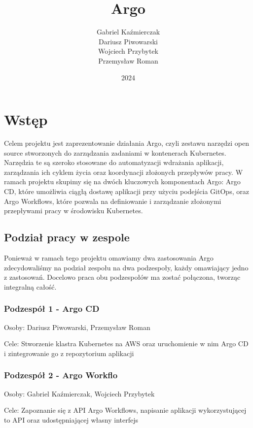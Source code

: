 \documentclass{article}
\title{\textbf{Argo}}
\author{Gabriel Kaźmierczak\\ Dariusz Piwowarski\\ Wojciech Przybytek\\ Przemysław Roman}
\date{2024}
\begin{document}
\begin{titlingpage}
\maketitle
\end{titlingpage}


\newpage
\tableofcontents


\newpage
\section{Wstęp}
Celem projektu jest zaprezentowanie działania Argo, czyli zestawu narzędzi open source stworzonych do zarządzania zadaniami w kontenerach Kubernetes. Narzędzia te są szeroko stosowane do automatyzacji wdrażania aplikacji, zarządzania ich cyklem życia oraz koordynacji złożonych przepływów pracy. W ramach projektu skupimy się na dwóch kluczowych komponentach Argo: Argo CD, które umożliwia ciągłą dostawę aplikacji przy użyciu podejścia GitOps, oraz Argo Workflows, które pozwala na definiowanie i zarządzanie złożonymi przepływami pracy w środowisku Kubernetes.

\subsection*{Podział pracy w zespole}
Ponieważ w ramach tego projektu omawiamy dwa zastosowania Argo zdecydowaliśmy na podział zespołu na dwa podzespoły, każdy omawiający jedno z zastosowań.
Docelowo praca obu podzespołów ma zostać połączona, tworząc integralną całość.

\subsubsection*{Podzespół 1 - Argo CD}
Osoby: Dariusz Piwowarski, Przemysław Roman

Cele: Stworzenie klastra Kubernetes na AWS oraz uruchomienie w nim Argo CD i zintegrowanie go z repozytorium aplikacji

\subsubsection*{Podzespół 2 - Argo Workflo}
Osoby: Gabriel Kaźmierczak, Wojciech Przybytek

Cele: Zapoznanie się z API Argo Workflows, napisanie aplikacji wykorzystującej to API oraz udostępniającej własny interfejs
\end{document}
